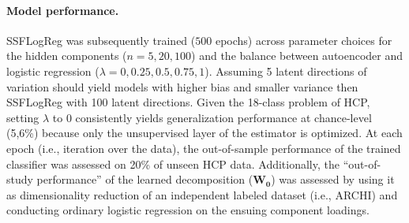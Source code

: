 \documentclass{article} %
\begin{document}
\begin{table}[h]
 \centering
 \vspace{-0.2cm}
 \caption{\textbf{Serial versus parallel dimensionality reduction and classification.}
 Chance is at 5,6\%.
 }
 \label{table_one}
 \end{table}
\paragraph{Model performance.}
SSFLogReg was subsequently trained ($500$ epochs) across parameter choices
for the hidden components ($n=5, 20, 100$) and
the balance between autoencoder and logistic regression
($\lambda=0, 0.25, 0.5, 0.75, 1$).
Assuming 5 latent directions of variation should yield models with
higher bias and smaller variance then SSFLogReg with 100 latent directions.
%
Given the 18-class problem of HCP, setting $\lambda$ to $0$
consistently yields generalization performance
at chance-level (5,6\%) because
only the unsupervised layer of the estimator is optimized.
%
At each epoch (i.e., iteration over the data),
the out-of-sample performance of the trained classifier
was assessed on 20\% of unseen HCP data.
Additionally, the ``out-of-study performance'' of
the learned decomposition ($\mathbf{W_0}$)
was assessed by using it as dimensionality reduction of an
independent labeled dataset (i.e., ARCHI) and conducting ordinary
logistic regression on the ensuing component loadings.
\end{document}
